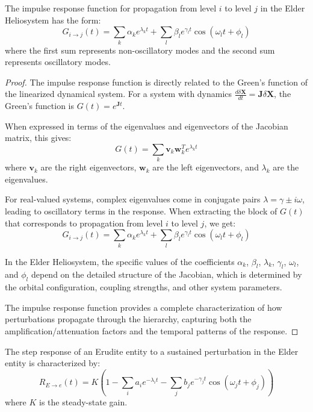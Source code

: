 \begin{theorem}
The impulse response function for propagation from level $i$ to level $j$ in the Elder Heliosystem has the form:
\begin{equation}
G_{i \to j}(t) = \sum_k \alpha_k e^{\lambda_k t} + \sum_l \beta_l e^{\gamma_l t} \cos(\omega_l t + \phi_l)
\end{equation}
where the first sum represents non-oscillatory modes and the second sum represents oscillatory modes.
\end{theorem}

\begin{proof}
The impulse response function is directly related to the Green's function of the linearized dynamical system. For a system with dynamics $\frac{d\delta\mathbf{X}}{dt} = \mathbf{J} \delta\mathbf{X}$, the Green's function is $G(t) = e^{\mathbf{J}t}$.

When expressed in terms of the eigenvalues and eigenvectors of the Jacobian matrix, this gives:
\begin{equation}
G(t) = \sum_k \mathbf{v}_k \mathbf{w}_k^T e^{\lambda_k t}
\end{equation}
where $\mathbf{v}_k$ are the right eigenvectors, $\mathbf{w}_k$ are the left eigenvectors, and $\lambda_k$ are the eigenvalues.

For real-valued systems, complex eigenvalues come in conjugate pairs $\lambda = \gamma \pm i\omega$, leading to oscillatory terms in the response. When extracting the block of $G(t)$ that corresponds to propagation from level $i$ to level $j$, we get:
\begin{equation}
G_{i \to j}(t) = \sum_k \alpha_k e^{\lambda_k t} + \sum_l \beta_l e^{\gamma_l t} \cos(\omega_l t + \phi_l)
\end{equation}

In the Elder Heliosystem, the specific values of the coefficients $\alpha_k$, $\beta_l$, $\lambda_k$, $\gamma_l$, $\omega_l$, and $\phi_l$ depend on the detailed structure of the Jacobian, which is determined by the orbital configuration, coupling strengths, and other system parameters.

The impulse response function provides a complete characterization of how perturbations propagate through the hierarchy, capturing both the amplification/attenuation factors and the temporal patterns of the response.
\end{proof}

\begin{theorem}
The step response of an Erudite entity to a sustained perturbation in the Elder entity is characterized by:
\begin{equation}
R_{E \to e}(t) = K \left( 1 - \sum_i a_i e^{-\lambda_i t} - \sum_j b_j e^{-\gamma_j t}\cos(\omega_j t + \phi_j) \right)
\end{equation}
where $K$ is the steady-state gain.
\end{theorem}

